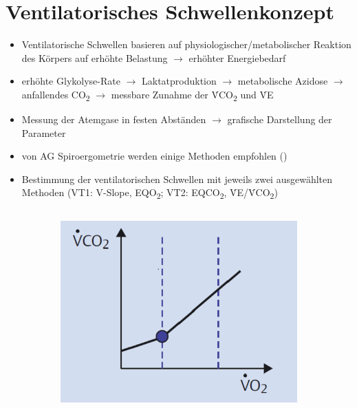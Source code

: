 \documentclass[colorBG,slideColor,8pt]{beamer}
\newcommand{\eqotwo}{EQO\textsubscript{2}}
\newcommand{\eqcotwo}{EQCO\textsubscript{2}}
\newcommand{\vcotwo}{\.{V}CO\textsubscript{2}}
\newcommand{\ve}{\.{V}E}
\begin{document}

\section{Ventilatorisches Schwellenkonzept}

\begin{frame}
\begin{itemize}
	\item Ventilatorische Schwellen basieren auf physiologischer/metabolischer Reaktion des Körpers auf erhöhte Belastung $\rightarrow$ erhöhter Energiebedarf
	\item erhöhte Glykolyse-Rate $\rightarrow$ Laktatproduktion $\rightarrow$ metabolische Azidose $\rightarrow$ anfallendes CO\textsubscript{2} $\rightarrow$ messbare Zunahme der \vcotwo{} und \ve
	\item Messung der Atemgase in festen Abständen $\rightarrow$ grafische Darstellung der Parameter
	\item von AG Spiroergometrie werden einige Methoden empfohlen (\cite{Westhoff.2012})
	\item Bestimmung der ventilatorischen Schwellen mit jeweils zwei ausgewählten Methoden (VT1: V-Slope, \eqotwo; VT2: \eqcotwo, \ve/\vcotwo)
\end{itemize}
\begin{columns}
\begin{column}{\linewidth}
\begin{figure}[H]
	\begin{subfigure}[c]{0.2\linewidth}
		\centering
		\includegraphics[width=0.8\linewidth]{Bilder/vslope.png}

\end{subfigure}
\end{figure}
\end{column}
\end{columns}
\end{frame}
\end{document}

